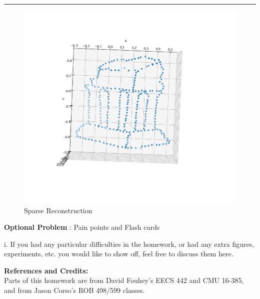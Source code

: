 \documentclass[onecolumn,10pt]{article}
\begin{document}
\hrule
\begin{figure}
  \centering
  \includegraphics[width=0.66 \textwidth]{media/Reconstruction.png} %
  \caption{Sparse Reconstruction}
  \label{fig:reconstruction}
\end{figure}


\addtocounter{problemnumber}{1}
\noindent\textbf{Optional Problem }: Pain points and Flash cards

i. If you had any particular difficulties in the homework, or had any extra figures, experiments, etc. you would like to show off, feel free to discuss them here.



\noindent\textbf{References and Credits:}\\
Parts of this homework are from David Fouhey's EECS 442 and CMU 16-385, and from Jason Corso's ROB 498/599 classes.
\end{document}
